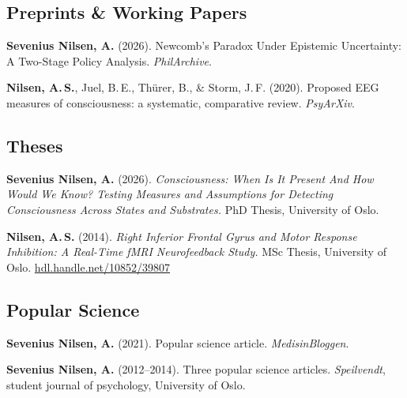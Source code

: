 \documentclass[11pt, a4paper]{article}
\begin{document}
\subsection*{Preprints \& Working Papers}

\begin{enumerate}[leftmargin=2em, label={[\arabic*]}, itemsep=0.4em]

  \item \textbf{Sevenius Nilsen, A.} (2026).
        Newcomb's Paradox Under Epistemic Uncertainty: A Two-Stage Policy Analysis.
        \textit{PhilArchive}.

  \item \textbf{Nilsen, A.\,S.}, Juel, B.\,E., Th\"urer, B., \& Storm, J.\,F. (2020).
        Proposed EEG measures of consciousness: a systematic, comparative review.
        \textit{PsyArXiv}.

\end{enumerate}

\subsection*{Theses}

\begin{enumerate}[leftmargin=2em, label={[\arabic*]}, itemsep=0.4em]

  \item \textbf{Sevenius Nilsen, A.} (2026).
        \textit{Consciousness: When Is It Present And How Would We Know?
        Testing Measures and Assumptions for Detecting Consciousness Across States and Substrates.}
        PhD Thesis, University of Oslo.

  \item \textbf{Nilsen, A.\,S.} (2014).
        \textit{Right Inferior Frontal Gyrus and Motor Response Inhibition:
        A Real-Time fMRI Neurofeedback Study.}
        MSc Thesis, University of Oslo.
        \href{http://hdl.handle.net/10852/39807}{hdl.handle.net/10852/39807}

\end{enumerate}

\subsection*{Popular Science}

\begin{enumerate}[leftmargin=2em, label={[\arabic*]}, itemsep=0.4em]
  \item \textbf{Sevenius Nilsen, A.} (2021). Popular science article. \textit{MedisinBloggen}.
  \item \textbf{Sevenius Nilsen, A.} (2012--2014). Three popular science articles.
        \textit{Speilvendt}, student journal of psychology, University of Oslo.
\end{enumerate}
\end{document}
